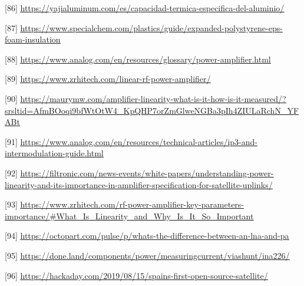 \documentclass[12pt,a4paper]{article}
\begin{document}
{[}86{]} \href{https://yajialuminum.com/es/capacidad-termica-especifica-del-aluminio/}{\ul{https://yajialuminum.com/es/capacidad-termica-especifica-del-aluminio/}}

{[}87{]} \href{https://www.specialchem.com/plastics/guide/expanded-polystyrene-eps-foam-insulation}{\ul{https://www.specialchem.com/plastics/guide/expanded-polystyrene-eps-foam-insulation}}

{[}88{]} \href{https://www.analog.com/en/resources/glossary/power-amplifier.html}{\ul{https://www.analog.com/en/resources/glossary/power-amplifier.html}}

{[}89{]} \href{https://www.zrhitech.com/linear-rf-power-amplifier/}{\ul{https://www.zrhitech.com/linear-rf-power-amplifier/}}

{[}90{]} \href{https://maurymw.com/amplifier-linearity-what-is-it-how-is-it-measured/?srsltid=AfmBOoqi9bfWtOtW4_KpQHP7orZmGlweNGBa3pIh4ZIULaRchN_YFABt}{\ul{https://maurymw.com/amplifier-linearity-what-is-it-how-is-it-measured/?srsltid=AfmBOoqi9bfWtOtW4\_KpQHP7orZmGlweNGBa3pIh4ZIULaRchN\_YFABt}}

{[}91{]} \href{https://www.analog.com/en/resources/technical-articles/ip3-and-intermodulation-guide.html}{\ul{https://www.analog.com/en/resources/technical-articles/ip3-and-intermodulation-guide.html}}

{[}92{]} \href{https://filtronic.com/news-events/white-papers/understanding-power-linearity-and-its-importance-in-amplifier-specification-for-satellite-uplinks/}{\ul{https://filtronic.com/news-events/white-papers/understanding-power-linearity-and-its-importance-in-amplifier-specification-for-satellite-uplinks/}}

{[}93{]} \href{https://www.zrhitech.com/rf-power-amplifier-key-parameters-importance/\#What_Is_Linearity_and_Why_Is_It_So_Important}{\ul{https://www.zrhitech.com/rf-power-amplifier-key-parameters-importance/\#What\_Is\_Linearity\_and\_Why\_Is\_It\_So\_Important}}

{[}94{]} \href{https://octopart.com/pulse/p/whats-the-difference-between-an-lna-and-pa}{\ul{https://octopart.com/pulse/p/whats-the-difference-between-an-lna-and-pa}}

{[}95{]} \href{https://done.land/components/power/measuringcurrent/viashunt/ina226/}{\ul{https://done.land/components/power/measuringcurrent/viashunt/ina226/}}

{[}96{]} \href{https://hackaday.com/2019/08/15/spains-first-open-source-satellite/}{\ul{https://hackaday.com/2019/08/15/spains-first-open-source-satellite/}}
\end{document}
